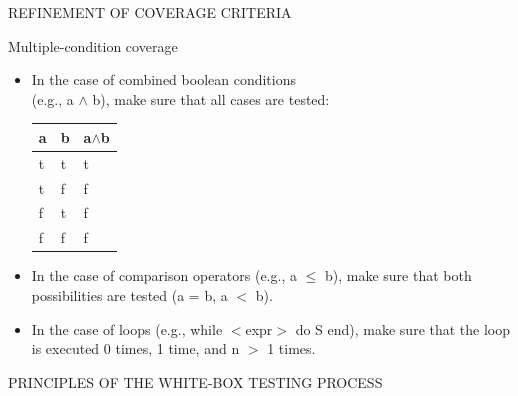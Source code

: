 \newpage
\centerline{REFINEMENT OF COVERAGE CRITERIA}
\bigskip

Multiple-condition coverage

\begin{itemize}

\item In the case of combined boolean conditions\\
(e.g., a $\wedge$ b), make sure that all cases are tested:

\begin{center}
\begin{tabular}{p{2cm}|p{2cm}||p{2cm}}
\hline
a & b & a$\wedge$b \\
\hline
\hline
t & t & t \\
t & f & f\\
f & t & f\\
f & f & f\\
\hline
\end{tabular}
\end{center}

\item In the case of comparison operators (e.g., a $\leq$ b), make
sure that both possibilities are tested (a = b, a $<$ b).

\item In the case of loops (e.g., while $<$expr$>$ do S end), make sure
that the loop is executed 0 times, 1 time, and n $>$ 1 times.

\end{itemize}

\newpage
\centerline{PRINCIPLES OF THE WHITE-BOX TESTING PROCESS}
\bigskip

